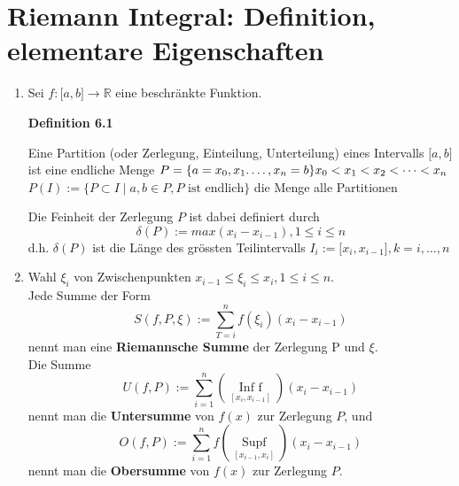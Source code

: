 \section{Riemann Integral: Definition, elementare Eigenschaften}
\begin{enumerate}
\item Sei $f: \lbrack a,b\rbrack\rightarrow\mathbb{R}$ eine beschränkte Funktion.\\

\begin{framed}
\centerline{\textbf{Definition 6.1}}
\noindent Eine Partition (oder Zerlegung, Einteilung, Unterteilung) eines Intervalls $\lbrack a,b\rbrack$ ist eine endliche Menge $P=\{a=x_0,x_1.\dots,x_n=b \}\\
x_0 < x_1 < x_2 < \dots < x_n$ \\
$P(I):=\{P\subset I \mid a,b\in P, P \text{ ist endlich}\}$ die Menge alle Partitionen \begin{center}
\end{center}
\end{framed}

Die Feinheit der Zerlegung $P$ ist dabei definiert durch $$\delta (P):=max(x_i - x_{i-1}), 1\leq i \leq n$$ d.h. $\delta (P)$ ist die Länge des grössten Teilintervalls $I_i:=\lbrack x_i,x_{i-1}\rbrack , k=i,\dots,n$

\item Wahl $\xi_i$ von Zwischenpunkten  $x_{i-1} \leq \xi_i  \leq x_i, 1\leq i \leq n$.\\
Jede Summe der Form $$S(f,P,\xi):=\sum\limits_{T = i}^n {f({\xi _i})} ({x_i} - {x_{i - 1}})$$ nennt man eine \textbf{Riemannsche Summe} der Zerlegung P und $\xi$.\\
Die Summe $$U(f,P):=\sum\limits_{i = 1}^n {(\mathop {{\text{Inf }}f}\limits_{[{x_i},{x_{i - 1}}]} )} ({x_i} - {x_{i - 1}})$$ nennt man die \textbf{Untersumme} von $f(x)$ zur Zerlegung $P$, und $$O(f,P):=\sum\limits_{i = 1}^n {f(\mathop {{\text{Sup}}f}\limits_{[{x_{i - 1}},{x_{i}}]} )} ({x_i} - {x_{i - 1}})$$ nennt man die \textbf{Obersumme} von $f(x)$ zur Zerlegung $P$.


\end{enumerate}
